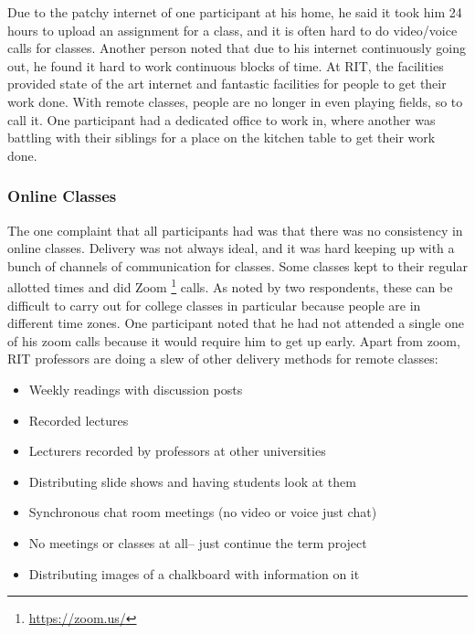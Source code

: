 \documentclass[12pt,
 reprint,
nofootinbib,
 amsmath,amssymb,
 aps,
floatfix,
]{revtex4-2}
\begin{document}
Due to the patchy internet of one participant at his home, he said it took him 24 hours to upload an assignment for a class, and it is often hard to do video/voice calls for classes. Another person noted that due to his internet continuously going out, he found it hard to work continuous blocks of time. At RIT, the facilities provided state of the art internet and fantastic facilities for people to get their work done. With remote classes, people are no longer in even playing fields, so to call it. One participant had a dedicated office to work in, where another was battling with their siblings for a place on the kitchen table to get their work done. 





\subsubsection{Online Classes}


The one complaint that all participants had was that there was no consistency in online classes. Delivery was not always ideal, and it was hard keeping up with a bunch of channels of communication for classes. Some classes kept to their regular allotted times and did Zoom \footnote{\url{https://zoom.us/}} calls. As noted by two respondents, these can be difficult to carry out for college classes in particular because people are in different time zones. One participant noted that he had not attended a single one of his zoom calls because it would require him to get up early. Apart from zoom, RIT professors are doing a slew of other delivery methods for remote classes:

\begin{itemize}
    \item Weekly readings with discussion posts
    \item Recorded lectures
    \item Lecturers recorded by professors at other universities
    \item Distributing slide shows and having students look at them
    \item Synchronous chat room meetings (no video or voice just chat)
    \item No meetings or classes at all-- just continue the term project
    \item Distributing images of a chalkboard with information on it
\end{itemize}
\end{document}
